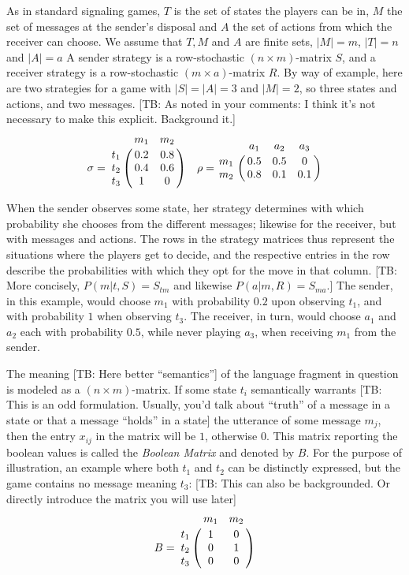 \documentclass[10pt]{article}
\newcommand{\tb}[1]{\textcolor[rgb]{.8,.33,.0}{[TB: #1]}}%
\begin{document}
As in standard signaling games, $T$ is the set of states the players can be in, $M$ the set of messages at the sender's disposal and $A$ the set of actions from which the receiver can choose. We assume that $T,M$ and $A$ are finite sets, $|M|=m$, $|T|=n$ and $|A|=a$  A sender strategy is a row-stochastic $(n \times m)$-matrix $S$, and a receiver strategy is a row-stochastic $(m\times a)$-matrix $R$. By way of example, here are two strategies for a game with $|S|=|A|=3$ and $|M|=2$, so three states and actions, and two messages. \tb{As noted in your comments: I think it's not necessary to make this explicit. Background it.} \\
\begin{equation*}
\sigma =
    \bordermatrix{
          & m_1 & m_2    \cr
      t_1 & 0.2 & 0.8  \cr
      t_2 & 0.4 & 0.6  \cr
      t_3 & 1 & 0
    } \quad
\rho =
    \bordermatrix{
              & a_1 & a_2 & a_3    \cr
          m_1 & 0.5 & 0.5 & 0  \cr
          m_2 & 0.8 & 0.1 & 0.1
        }
\end{equation*}

When the sender observes some state, her strategy determines with which probability she chooses from the different messages; likewise for the receiver, but with messages and actions. The rows in the strategy matrices thus represent the situations where the players get to decide, and the respective entries in the row describe the probabilities with which they opt for the move in that column. \tb{More concisely, $P(m|t,S) = S_{tm}$ and likewise $P(a|m,R) = S_{ma}$.}  The sender, in this example, would choose $m_1$ with probability $0.2$ upon observing $t_1$, and with probability $1$ when observing $t_3$. The receiver, in turn, would choose $a_1$ and $a_2$ each with probability $0.5$, while never playing $a_3$, when receiving $m_1$ from the sender.

The meaning \tb{Here better ``semantics''} of the language fragment in question is modeled as a $(n \times m)$-matrix. If some state $t_i$ semantically warrants \tb{This is an odd formulation. Usually, you'd talk about ``truth'' of a message in a state or that a message ``holds'' in a state} the utterance of some message $m_j$, then the entry $x_{ij}$ in the matrix will be $1$, otherwise $0$. This matrix reporting the boolean values is called the \textit{Boolean Matrix} and denoted by $B$. For the purpose of illustration, an example where both $t_1$ and $t_2$ can be distinctly expressed, but the game contains no message meaning $t_3$: \tb{This can also be backgrounded. Or directly introduce the matrix you will use later}\\
\begin{equation*}
B =
    \bordermatrix{
              & m_1 & m_2    \cr
          t_1 & 1 & 0  \cr
          t_2 & 0 & 1  \cr
          t_3 & 0 & 0
        }
\end{equation*}
\end{document}
